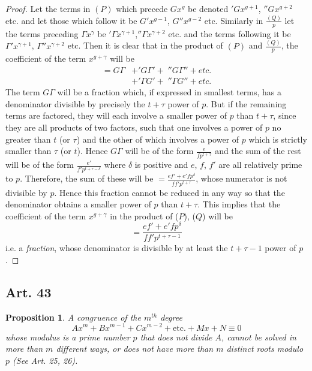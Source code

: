 \documentclass{book}
\theoremstyle{plain}
\newtheorem{proposition}{Proposition}
\theoremstyle{remark}
\begin{document}
\begin{proof}
Let the terms in $(P)$ which precede $Gx^g$ be denoted $'Gx^{g+1}$, $''Gx^{g+2}$ etc. and let those which follow it be $G'x^{g-1}$, $G''x^{g-2}$ etc.  Similarly in $\frac{(Q)}{p}$ let the terms preceding $\Gamma x^{\gamma}$ be $'\Gamma x^{\gamma+1}$,$''\Gamma x^{\gamma+2}$ etc. and the terms following it be $\Gamma' x^{\gamma+1}$, $\Gamma'' x^{\gamma+2}$ etc.  Then it is clear that in the product of $(P)$ and $\frac{(Q)}{p}$, the coefficient of the term $x^{g+\gamma}$ will be 
\begin{align} = G\Gamma& + 'G \Gamma' +\; ''G \Gamma'' + etc. \\
& + '\Gamma G' + \;''\Gamma G'' + etc. \end{align}
The term $G \Gamma$ will be a fraction which, if expressed in smallest terms, has a denominator divisible by precisely the $t + \tau$ power of $p$.  But if the remaining terms are factored, they will each involve a smaller power of $p$ than $t + \tau$, since they are all products of two factors, such that one involves a  power of $p$ no greater than $t$ (or $\tau$) and the other of which involves a power of $p$ which is strictly smaller than $\tau$ (or $t$).  Hence $G \Gamma$ will be of the form $\frac{e}{f p^{t + \tau}}$ and the sum of the rest will be of the form $\frac{e'}{f' p^{t + \tau - \delta}}$ where $\delta$ is positive and $e$, $f$, $f'$ are all relatively prime to $p$.  Therefore, the sum of these will be $= \frac{ef' + e'fp^{\delta}}{ff'p^{t+\tau}}$, whose numerator is not divisible by $p$.   Hence this fraction cannot be reduced in any way so that the denominator obtains a smaller power of $p$ than $t + \tau$.    This implies that the coefficient of the term $x^{g+\gamma}$ in the product of ($P$), ($Q$) will be 
\[ = \frac{ef' + e'f p^{\delta}}{ff'p^{t+\tau-1}} \]
i.e. a \emph{fraction}, whose denominator is divisible by at least the $t + \tau-1$ power of $p$. 
\end{proof}

\subsection*{Art. 43}  
\begin{proposition} A congruence of the $m^{th}$ degree
\[ Ax^m + Bx^{m-1} + Cx^{m-2} + \textrm{etc.} + Mx + N \equiv 0 \]
whose modulus is a prime number $p$ that does not divide $A$, cannot be solved in more than $m$ different ways, or does not have more than $m$ distinct roots modulo $p$ (See Art. 25, 26). \end{proposition}
\end{document}
